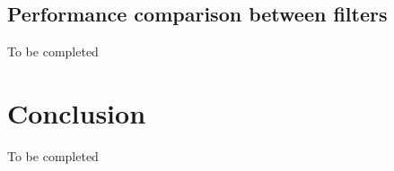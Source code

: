 \documentclass[10pt,letterpaper,final]{article}
\begin{document}
%
%
%
%


\subsection{Performance comparison between filters}
To be completed




\section{Conclusion}
\label{sec:conclusion}
To be completed
\end{document}
